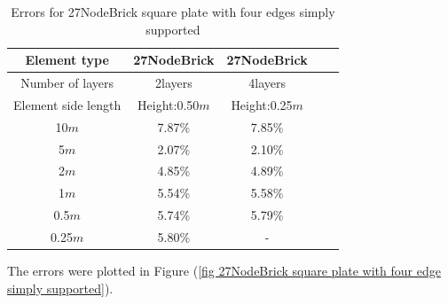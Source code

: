 \documentclass[fleqn,11pt,letter]{article}
\begin{document}
\begin{table}[H]
  \centering
  \caption{Errors for 27NodeBrick square plate with four edges simply supported}
  \label{table Errors for 27NodeBrick square plate with four edges simply supported}
\begin{tabular}{|c|c|c|c|c|}
\hline
Element type        & 27NodeBrick     & 27NodeBrick      \\ \hline
Number of layers         & 2layers         & 4layers          \\ \hline
Element side length  & Height:0.50$m$ & Height:0.25$m$  \\ \hline
10$m$                & 7.87\% & 7.85\%        \\ \hline
5$m$                 & 2.07\% & 2.10\%        \\ \hline
2$m$                 & 4.85\% & 4.89\%        \\ \hline
1$m$                 & 5.54\% & 5.58\%        \\ \hline
0.5$m$               & 5.74\% & 5.79\%        \\ \hline
0.25$m$              & 5.80\% &    -           \\
\hline
\end{tabular}
\end{table}


The errors were plotted in Figure (\ref{fig 27NodeBrick square plate with four edge simply supported}).
\end{document}
